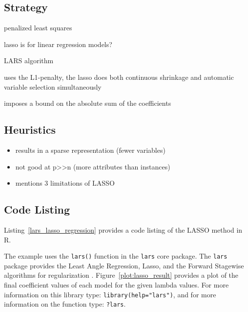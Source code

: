 \subsection{Strategy}

penalized least squares

lasso is for linear regression models?

LARS algorithm

uses the L1-penalty, the lasso does both continuous shrinkage and automatic variable selection simultaneously

imposes a bound on the absolute sum of the coefficients

\subsection{Heuristics}

\begin{itemize}
	\item results in a sparse representation (fewer variables)
	\item  not good at p>>n (more attributes than instances)
	\item \cite{Zou2005} mentions 3 limitations of LASSO
\end{itemize}

\subsection{Code Listing}
Listing~\ref{lars_lasso_regression} provides a code listing of the LASSO method in R.


The example uses the \texttt{lars()} function in the \texttt{lars} core package. The \texttt{lars} package provides the Least Angle Regression, Lasso, and the Forward Stagewise algorithms for regularization \cite{Hastie2011}. Figure~\ref{plot:lasso_result} provides a plot of the final coefficient values of each model for the given lambda values. For more information on this library type: \texttt{library(help="lars")}, and for more information on the function type: \texttt{?lars}.

